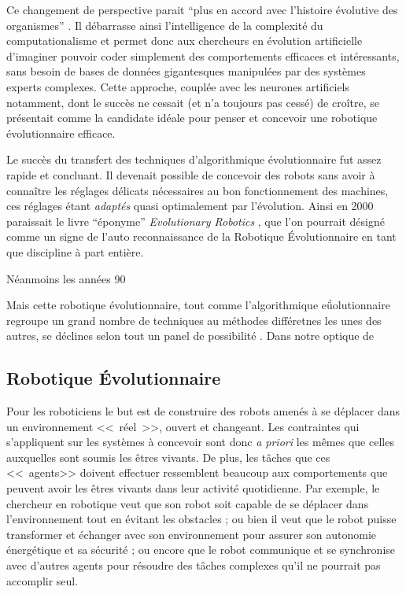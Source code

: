 Ce changement de perspective parait ``plus en accord avec l'histoire évolutive des organismes'' \citep[p. Brooks dans la préface de ][p. 15]{pfeifer2006howthebodyshapesthewaywethink}. Il débarrasse ainsi l'intelligence de la complexité du computationalisme et permet donc aux chercheurs en évolution artificielle d'imaginer pouvoir coder simplement des comportements efficaces et intéressants, sans besoin de bases de données gigantesques manipulées par des systèmes experts complexes. Cette approche, couplée avec les neurones artificiels notamment, dont le succès ne cessait (et n'a toujours pas cessé) de croître, se présentait comme la candidate idéale pour penser et concevoir une robotique évolutionnaire efficace.

Le succès du transfert des techniques d'algorithmique évolutionnaire fut assez rapide et concluant. Il devenait possible de concevoir des robots sans avoir à connaître les réglages délicats nécessaires au bon fonctionnement des machines, ces réglages étant \emph{adaptés} quasi optimalement par l'évolution. 
Ainsi en 2000 paraissait le livre ``éponyme'' \emph{Evolutionary Robotics} \citep{nolfi00evolrobobiolintetechselfmach}, que l'on pourrait désigné comme un signe de l'auto reconnaissance de la Robotique Évolutionnaire en tant que discipline à part entière. 

Néanmoins les années 90 

Mais cette robotique évolutionnaire, tout comme l'algorithmique eǘolutionnaire regroupe un grand nombre de techniques au méthodes différetnes les unes des autres, se déclines selon tout un panel de possibilité . 
Dans notre optique de

\subsection{Robotique \'Evolutionnaire}\label{sec:re}
Pour les roboticiens le but est de construire des robots amenés à se déplacer dans un environnement <<~réel~>>, ouvert et changeant. Les contraintes qui s'appliquent sur les systèmes à concevoir sont donc \emph{a priori} les mêmes que celles auxquelles sont soumis les êtres vivants. De plus, les t\^{a}ches que ces <<~agents>> doivent effectuer ressemblent beaucoup aux comportements que peuvent avoir les êtres vivants dans leur activité quotidienne. Par exemple, le chercheur en robotique veut que son robot soit capable de se déplacer dans l'environnement tout en évitant les obstacles ; ou bien il veut que le robot puisse transformer et échanger avec son environnement pour assurer son autonomie énergétique et sa sécurité ; ou encore que le robot communique et se synchronise avec d'autres agents pour résoudre des tâches complexes qu'il ne pourrait pas accomplir seul.

